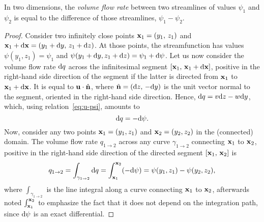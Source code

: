 \begin{propertyapp} \label{prop:streamfunction-flowrate}
	In two dimensions, the \textit{volume flow rate} between two streamlines of values $\psi_1$ and $\psi_2$ is equal to the difference of those streamlines, $\psi_1 - \psi_2$.
\end{propertyapp}
\begin{proof}
	Consider two infinitely close points $\b x_1 = (y_1,\, z_1)$ and $\b x_1 + \rm d \b x = (y_1 + \rm dy,\, z_1 + \rm dz)$. At those points, the streamfunction has values $\psi(y_1,z_1) = \psi_1$ and $\psi(y_1+\rm dy,z_1 + \rm dz) = \psi_1 + \rm d\psi$. Let us now consider the volume flow rate $\rm dq$ across the infinitesimal segment $[\b x_1,\, \b x_1 + \rm d \b x]$, positive in the right-hand side direction of the segment if the latter is directed from $\b x_1$ to $\b x_1 + \rm d \b x$. It is equal to $\b u \cdot \hat{\b{n}}$, where $\hat{\b{n}} = (\rm dz,\,-\rm dy)$ is the unit vector normal to the segment, oriented in the right-hand side direction. Hence, $\rm dq = v \rm dz - w \rm dy$, which, using relation~\eqref{eq:u-psi}, amounts to
	\begin{equation}
		\rm dq = - \rm d\psi.
	\end{equation}
	Now, consider any two points $\b x_1 = (y_1, z_1)$ and $\b x_2 = (y_2, z_2)$ in the (connected) domain. The volume flow rate $q_{1 \rightarrow 2}$ across any curve $\gamma_{1 \rightarrow 2}$ connecting $\b x_1$ to $\b x_2$, positive in the right-hand side direction of the directed segment $[\b x_1,\, \b x_2]$ is
	\begin{equation}
		q_{1 \rightarrow 2} = \int_{\gamma_{1 \rightarrow 2}} \rm dq = \int_{\b x_1}^{\b x_2} (-\rm d\psi) = \psi(y_1,z_1) - \psi(y_2,z_2), 	
	\end{equation} 
	where $\int_{\gamma_{1 \rightarrow 2}}$ is the line integral along a curve connecting $\b x_1$ to $\b x_2$, afterwards noted $\int_{\b x_1}^{\b x_2}$ to emphasize the fact that it does not depend on the integration path, since $\rm d\psi$ is an exact differential.
\end{proof}
